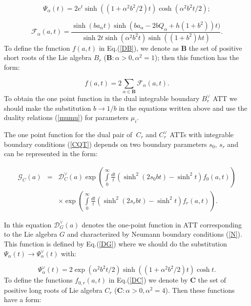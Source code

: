 \documentclass[a4paper,12pt,titlepage,final]{article}
\begin{document}
\begin{equation}
\Psi _{\alpha }(t)=2e^{t}\sinh ((1+\alpha ^{2}b^{2}/2)t)\cosh (\alpha
^{2}b^{2}t/2);  \label{psi}
\end{equation}

\begin{equation}
\mathcal{F}_{\alpha }(a,t)=\frac{\sinh (ba_{\alpha }t)\sinh (ba_{\alpha
}-2bQ_{\alpha }+h(1+b^{2}))t)}{\sinh 2t\sinh (\alpha ^{2}b^{2}t)\sinh
((1+b^{2})ht)}.  \label{cal}
\end{equation}
To define the function $f(a,t)$ in Eq.(\ref{DB}), we denote as
$\mathbf{B}$ the set of positive short roots of the Lie algebra
$B_{r}$ ($\mathbf{B:}\alpha>0,\alpha ^{2}=1$); then this function has
the form:

\begin{equation}
f(a,t)=2\sum_{\alpha \in \mathbf{B}}\mathcal{F}_{\alpha }(a,t).  \label{f}
\end{equation}
To obtain the one point function in the dual integrable boundary
$B_{r}^{\vee }$ ATT we should make the substitution $b\rightarrow 1/b$
in the equations written above and use the duality relations
(\ref{mumu}) for parameters $\mu _{i}$.

The one point function for the dual pair of $\ C_{r}$ and $C_{r}^{\vee
}$ ATTs with integrable boundary conditions (\ref{CQT}) depends on two
boundary parameters $s_{0}$, $s_{r}$ and can be represented in the
form:

\begin{eqnarray}
\mathcal{G}_{C}(a) &=&\mathcal{D}_{C}^{\vee }(a)\exp \left(
\int\limits_{0}^{\infty }\frac{dt}{t}(\sinh ^{2}(2s_{0}bt)-\sinh
^{2}t)f_{0}(a,t)\right)  \nonumber \\
&&\times \exp \left( \int\limits_{0}^{\infty }\frac{dt}{t}(\sinh
^{2}(2s_{r}bt)-\sinh ^{2}t)f_{r}(a,t)\right) .  \label{DC}
\end{eqnarray}

In this equation $\mathcal{D}_{G}^{\vee }(a)$ denotes the one-point function
in ATT corresponding to the Lie algebra $G$ and characterized by Neumann
boundary conditions (\ref{N}). This function is defined by Eq.(\ref{DG})
where we should do the substitution $\Psi _{\alpha }(t)\rightarrow \Psi
_{\alpha }^{\vee }(t)$ with:

\begin{equation}
\Psi _{\alpha }^{\vee }(t)=2\exp (\alpha ^{2}b^{2}t/2)\sinh ((1+\alpha
^{2}b^{2}/2)t)\cosh t.  \label{pd}
\end{equation}
To define the functions $f_{0,r}(a,t)$ in Eq.(\ref{DC}) we denote by
$\mathbf{C}$ the set of positive long roots of Lie algebra $C_{r}$
($\mathbf{C:}\alpha >0,\alpha ^{2}=4$).
Then these functions have a form:
\end{document}
